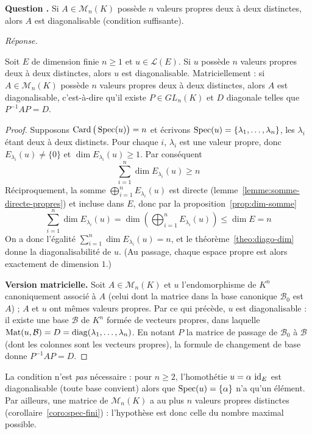 \documentclass[11pt]{article}
\newcounter{qnum}
\newcommand{\question}[1]{%
\stepcounter{qnum}%
\bigskip
\noindent\textbf{Question \theqnum.} #1\par}
\newcommand{\reponse}{\noindent\textit{Réponse.}\ }
\begin{document}
\question{Si $A\in\mathcal{M}_n(K)$ possède $n$ valeurs propres deux à deux distinctes, alors $A$ est diagonalisable (condition suffisante).}
\reponse

\begin{coro}
\label{coro:n-vp-distinctes}
Soit $E$ de dimension finie $n\geq 1$ et $u\in\mathcal{L}(E)$. Si $u$ possède $n$ valeurs propres deux à deux distinctes, alors $u$ est diagonalisable. Matriciellement : si $A\in\mathcal{M}_n(K)$ possède $n$ valeurs propres deux à deux distinctes, alors $A$ est diagonalisable, c'est-à-dire qu'il existe $P\in GL_n(K)$ et $D$ diagonale telles que $P^{-1}AP=D$.
\end{coro}

\begin{proof}
Supposons $\operatorname{Card}\big(\operatorname{Spec}(u)\big)=n$ et écrivons $\operatorname{Spec}(u)=\{\lambda_1,\dots,\lambda_n\}$, les $\lambda_i$ étant deux à deux distincts. Pour chaque $i$, $\lambda_i$ est une valeur propre, donc $E_{\lambda_i}(u)\neq\{0\}$ et $\dim E_{\lambda_i}(u)\geq 1$. Par conséquent
\[\sum_{i=1}^{n}\dim E_{\lambda_i}(u) \geq n\]
Réciproquement, la somme $\bigoplus_{i=1}^{n}E_{\lambda_i}(u)$ est directe (lemme~\ref{lemme:somme-directe-propres}) et incluse dans $E$, donc par la proposition~\ref{prop:dim-somme}
\[\sum_{i=1}^{n}\dim E_{\lambda_i}(u) = \dim\left(\bigoplus_{i=1}^{n}E_{\lambda_i}(u)\right) \leq \dim E = n\]
On a donc l'égalité $\sum_{i=1}^{n}\dim E_{\lambda_i}(u)=n$, et le théorème~\ref{theo:diago-dim} donne la diagonalisabilité de $u$. (Au passage, chaque espace propre est alors exactement de dimension $1$.)

\textbf{Version matricielle.} Soit $A\in\mathcal{M}_n(K)$ et $u$ l'endomorphisme de $K^n$ canoniquement associé à $A$ (celui dont la matrice dans la base canonique $\mathcal{B}_0$ est $A$) ; $A$ et $u$ ont mêmes valeurs propres. Par ce qui précède, $u$ est diagonalisable : il existe une base $\mathcal{B}$ de $K^n$ formée de vecteurs propres, dans laquelle $\mathrm{Mat}(u,\mathcal{B})=D=\operatorname{diag}(\lambda_1,\dots,\lambda_n)$. En notant $P$ la matrice de passage de $\mathcal{B}_0$ à $\mathcal{B}$ (dont les colonnes sont les vecteurs propres), la formule de changement de base donne $P^{-1}AP=D$.
\end{proof}

\begin{remarque}
La condition n'est \emph{pas} nécessaire : pour $n\geq 2$, l'homothétie $u=\alpha\,\operatorname{id}_E$ est diagonalisable (toute base convient) alors que $\operatorname{Spec}(u)=\{\alpha\}$ n'a qu'un élément. Par ailleurs, une matrice de $\mathcal{M}_n(K)$ a au plus $n$ valeurs propres distinctes (corollaire~\ref{coro:spec-fini}) : l'hypothèse est donc celle du nombre maximal possible.
\end{remarque}
\end{document}
